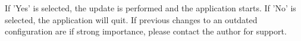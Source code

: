 If 'Yes' is selected, the update is performed and the application starts. If 'No' is selected, the application will quit. If previous changes to an outdated configuration are if strong importance, please contact the author for support. 
























